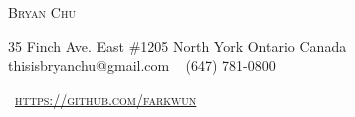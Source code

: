 \documentclass[a4paper, oneside, final]{scrartcl} %
\begin{document}
\setlength{\pdfpagewidth}{8.5in}
\setlength{\pdfpageheight}{11in}

\begin{center} %


  {\fontsize{36}{36}\selectfont\scshape {Bryan Chu}} %

  \vspace{0.3cm} %

  {\renewcommand{\headfont}{\normalfont\rmfamily\scshape} %
    \fontsize{12.5}{17}\selectfont\scshape %

    35 Finch Ave. East $\#$1205 {\large\textperiodcentered} North York {\large\textperiodcentered} Ontario {\large\textperiodcentered} Canada\\ %
    {\Large\Letter} thisisbryanchu@gmail.com \ {\Large\Telefon} (647) 781-0800 \ %
  }

  {\renewcommand{\headfont}{\normalfont\rmfamily\scshape} %
    \fontsize{12.5}{17}\selectfont\scshape %
    \faGithub \ \href{https://github.com/farkwun}{https://github.com/farkwun}
  }

%



\end{center}
\end{document}
